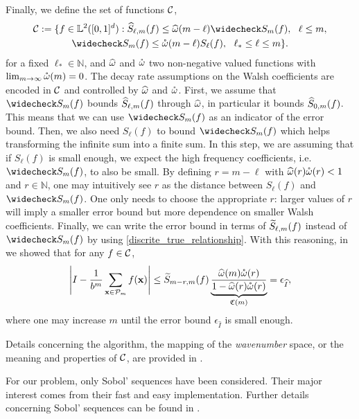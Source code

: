 Finally, we define the set of functions $\mathcal{C}$,
\begin{multline} \label{conecond}
\cc:=\{f \in \mathbb{L}^2(\cube) : \hS_{\ell,m}(f) \le \homega(m-\ell) \wcS_m(f),\ \ \ell \le m, \\
\wcS_m(f) \le \wcomega(m-\ell) S_{\ell}(f),\ \  \ell_* \le \ell \le m\}.
\end{multline}
for a fixed $\ell_* \in \mathbb{N}$, and $\widehat{\omega}$ and $\mathring{\omega}$ two non-negative valued functions with $\lim_{m \to \infty} \mathring{\omega}(m) = 0$. The decay rate assumptions on the Walsh coefficients are encoded in $\mathcal{C}$ and controlled by $\widehat{\omega}$ and $\mathring{\omega}$. First, we assume that $\wcS_m(f)$ bounds $\widehat{S}_{\ell,m}(f)$ through $\widehat{\omega}$, in particular it bounds $\widehat{S}_{0,m}(f)$. This means that we can use $\wcS_m(f)$ as an indicator of the error bound. Then, we also need $S_{\ell}(f)$ to bound $\wcS_m(f)$ which helps transforming the infinite sum into a finite sum. In this step, we are assuming that if $S_{\ell}(f)$ is small enough, we expect the high frequency coefficients, i.e. $\wcS_m(f)$, to also be small. By defining $r=m-\ell$ with $\widehat{\omega}(r)\mathring{\omega}(r)<1$ and $r\in\mathbb{N}$, one may intuitively see $r$ as the distance between $S_{\ell}(f)$ and $\wcS_m(f)$. One only needs to choose the appropriate $r$: larger values of $r$ will imply a smaller error bound but more dependence on smaller Walsh coefficients. Finally, we can write the error bound in terms of $\widetilde{S}_{\ell,m}(f)$ instead of $\wcS_m(f)$ by using \eqref{discrite_true_relationship}. With this reasoning, in \cite[Sec. 4.2]{HicJim} we showed that for any $f\in\mathcal{C}$,
\begin{equation}
\left\lvert I - \frac{1}{b^m}\sum_{\boldsymbol{\mathbf{x}}\in\mathcal{P}_m}f(\boldsymbol{\mathbf{x}})\right\rvert
\le \widetilde{S}_{m-r,m}(f)\underbrace{\frac{\widehat{\omega}(m) \mathring{\omega}(r)}{1 - \widehat{\omega}(r) \mathring{\omega}(r)}}_{\mathfrak{C}(m)}=\epsilon_{\widehat{I}}, \label{errbd}
\end{equation}
where one may increase $m$ until the error bound $\epsilon_{\widehat{I}}$ is small enough.

Details concerning the algorithm, the mapping of the \emph{wavenumber} space, or the meaning and properties of $\mathcal{C}$, are provided in \cite{HicJim}. 

For our problem, only Sobol' sequences \cite{Sobol'seq} have been considered. Their major interest comes from their fast and easy implementation. Further details concerning Sobol' sequences can be found in \cite{Lemieuxbook,Niederreiter}.

